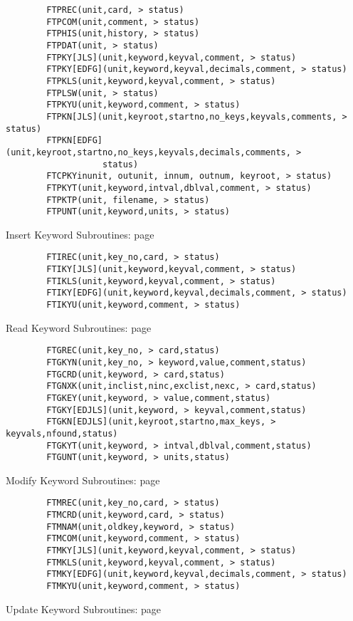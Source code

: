 \documentclass[11pt]{book}
\begin{document}
\begin{verbatim}
        FTPREC(unit,card, > status)
        FTPCOM(unit,comment, > status)
        FTPHIS(unit,history, > status)
        FTPDAT(unit, > status)
        FTPKY[JLS](unit,keyword,keyval,comment, > status)
        FTPKY[EDFG](unit,keyword,keyval,decimals,comment, > status)
        FTPKLS(unit,keyword,keyval,comment, > status)
        FTPLSW(unit, > status)
        FTPKYU(unit,keyword,comment, > status)
        FTPKN[JLS](unit,keyroot,startno,no_keys,keyvals,comments, > status)
        FTPKN[EDFG](unit,keyroot,startno,no_keys,keyvals,decimals,comments, >
                   status)
        FTCPKYinunit, outunit, innum, outnum, keyroot, > status)
        FTPKYT(unit,keyword,intval,dblval,comment, > status)
        FTPKTP(unit, filename, > status)
        FTPUNT(unit,keyword,units, > status)
\end{verbatim}
 Insert Keyword Subroutines: page~\pageref{FTIREC}

\begin{verbatim}
        FTIREC(unit,key_no,card, > status)
        FTIKY[JLS](unit,keyword,keyval,comment, > status)
        FTIKLS(unit,keyword,keyval,comment, > status)
        FTIKY[EDFG](unit,keyword,keyval,decimals,comment, > status)
        FTIKYU(unit,keyword,comment, > status)
\end{verbatim}
 Read Keyword Subroutines: page~\pageref{FTGREC}

\begin{verbatim}
        FTGREC(unit,key_no, > card,status)
        FTGKYN(unit,key_no, > keyword,value,comment,status)
        FTGCRD(unit,keyword, > card,status)
        FTGNXK(unit,inclist,ninc,exclist,nexc, > card,status)
        FTGKEY(unit,keyword, > value,comment,status)
        FTGKY[EDJLS](unit,keyword, > keyval,comment,status)
        FTGKN[EDJLS](unit,keyroot,startno,max_keys, > keyvals,nfound,status)
        FTGKYT(unit,keyword, > intval,dblval,comment,status)
        FTGUNT(unit,keyword, > units,status)
\end{verbatim}
 Modify Keyword Subroutines: page~\pageref{FTMREC}

\begin{verbatim}
        FTMREC(unit,key_no,card, > status)
        FTMCRD(unit,keyword,card, > status)
        FTMNAM(unit,oldkey,keyword, > status)
        FTMCOM(unit,keyword,comment, > status)
        FTMKY[JLS](unit,keyword,keyval,comment, > status)
        FTMKLS(unit,keyword,keyval,comment, > status)
        FTMKY[EDFG](unit,keyword,keyval,decimals,comment, > status)
        FTMKYU(unit,keyword,comment, > status)
\end{verbatim}
 Update Keyword Subroutines: page~\pageref{FTUCRD}
\end{document}
